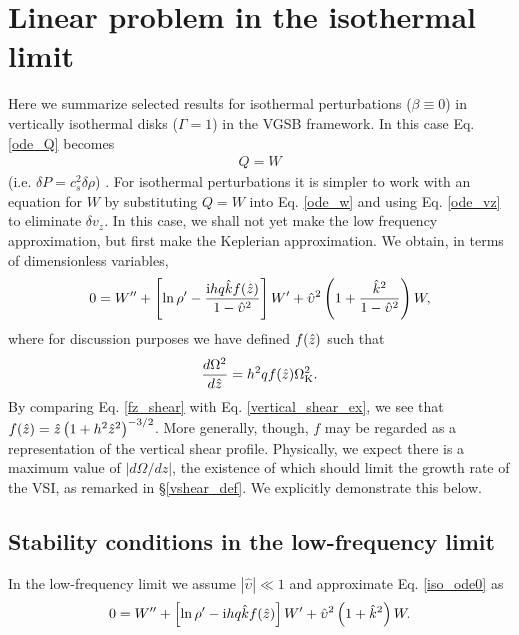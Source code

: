 \section{Linear problem in the isothermal limit}\label{iso_discuss}  
Here we summarize selected results for isothermal
perturbations ($\beta\equiv 0$) in vertically isothermal disks 
($\Gamma=1$) in the VGSB framework. In this case Eq. \ref{ode_Q}
becomes    
\begin{align} 
  Q = W 
\end{align}
(i.e. $\delta P = c_s^2\delta \rho$)%
. For isothermal perturbations it is 
simpler to work with an equation for $W$ by substituting $Q=W$ into
Eq. \ref{ode_w} and using Eq. \ref{ode_vz} to eliminate $\delta v_z$. 
In this case, we shall not yet make the low frequency
approximation, but first make the  Keplerian approximation. We
obtain, in terms of dimensionless variables, 
\begin{align}
  0 = W^{\prime\prime} + \left[\ln\rho^\prime - \frac{\mathrm{i} h q \hat{k} f(\hat{z})
      }{1-\hat{\upsilon}^2} \right]W^\prime +
  \hat{\upsilon}^2\left(1+\frac{\hat{k}^2}{1-\hat{\upsilon}^2}\right)W,\label{iso_ode0} 
\end{align}
where for discussion purposes we have defined $f(\hat{z})$ such that
\begin{align}\label{fz_shear}
  \frac{d\Omega^2}{d\hat{z}} = h^2q f(\hat{z})\Omega_{\rm K}^2.
\end{align}
By comparing Eq. \ref{fz_shear} with Eq. \ref{vertical_shear_ex}, we
see that $f(\hat{z})= 
\hat{z}\left(1+h^2\hat{z}^2\right)^{-3/2}$. More generally, though,
$f$ may be regarded as a representation of the vertical
shear profile. Physically, we expect there is a maximum value of 
$|d\Omega/dz|$, the existence of which should limit the growth rate of
the VSI,  as remarked in \S\ref{vshear_def}. We explicitly demonstrate
this below.     

\subsection{Stability conditions in the low-frequency limit}
In the low-frequency limit we assume $|\hat{\upsilon}|\ll 1$ and
approximate Eq. \ref{iso_ode0} as 
\begin{align}
  0 = W^{\prime\prime} + \left[\ln\rho^\prime - \mathrm{i} h q \hat{k}
    f(\hat{z})\right]W^\prime +
  \hat{\upsilon}^2\left(1+\hat{k}^2\right)W. \label{iso_ode1}
\end{align}
